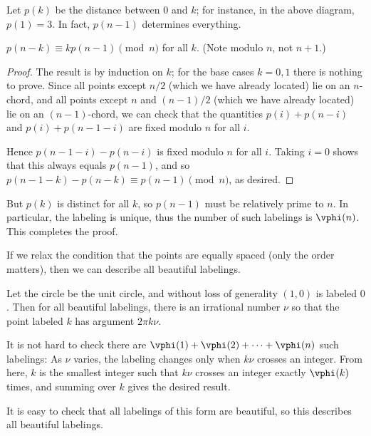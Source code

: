 Let $p(k)$ be the distance between $0$ and $k$; for instance, in the above diagram, $p(1)=3$. In fact, $p(n-1)$ determines everything.
\begin{claim}
    $p(n-k)\equiv kp(n-1)\pmod n$ for all $k$. (Note modulo $n$, not $n+1$.)
\end{claim}
\begin{proof}
    The result is by induction on $k$; for the base cases $k=0,1$ there is nothing to prove. Since all points except $n/2$ (which we have already located) lie on an $n$-chord, and all points except $n$ and $(n-1)/2$ (which we have already located) lie on an $(n-1)$-chord, we can check that the quantities $p(i)+p(n-i)$ and $p(i)+p(n-1-i)$ are fixed modulo $n$ for all $i$.

    Hence $p(n-1-i)-p(n-i)$ is fixed modulo $n$ for all $i$. Taking $i=0$ shows that this always equals $p(n-1)$, and so $p(n-1-k)-p(n-k)\equiv p(n-1)\pmod n$, as desired.
\end{proof}

But $p(k)$ is distinct for all $k$, so $p(n-1)$ must be relatively prime to $n$. In particular, the labeling is unique, thus the number of such labelings is $\vphi(n)$. This completes the proof.
\begin{remark}
    If we relax the condition that the points are equally spaced (only the order matters), then we can describe all beautiful labelings.

    Let the circle be the unit circle, and without loss of generality $(1,0)$ is labeled $0$. Then for all beautiful labelings, there is an irrational number $\nu$ so that the point labeled $k$ has argument $2\pi k\nu$.

    It is not hard to check there are $\vphi(1)+\vphi(2)+\cdots+\vphi(n)$ such labelings: As $\nu$ varies, the labeling changes only when $k\nu$ crosses an integer. From here, $k$ is the smallest integer such that $k\nu$ crosses an integer exactly $\vphi(k)$ times, and summing over $k$ gives the desired result.

    It is easy to check that all labelings of this form are beautiful, so this describes all beautiful labelings.
\end{remark}
